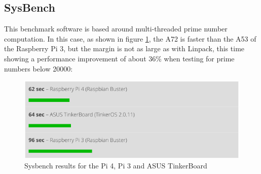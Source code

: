 \subsection*{SysBench}
\hspace{\parindent}This benchmark software is based around multi-threaded prime number computation. In this case, as shown in figure \ref{sysbench}, the A72 is faster than the A53 of the Raspberry Pi 3, but the margin is not as large as with Linpack, this time showing a performance improvement of about 36\% when testing for prime numbers below 20000: \cite{sysbench}
\begin{figure}[H]
	\begin{center}
		\includegraphics[width=0.7\linewidth]{imgs/sysbench.png}
		\caption{Sysbench results for the Pi 4, Pi 3 and ASUS TinkerBoard}
		\label{sysbench}
	\end{center}
\end{figure}